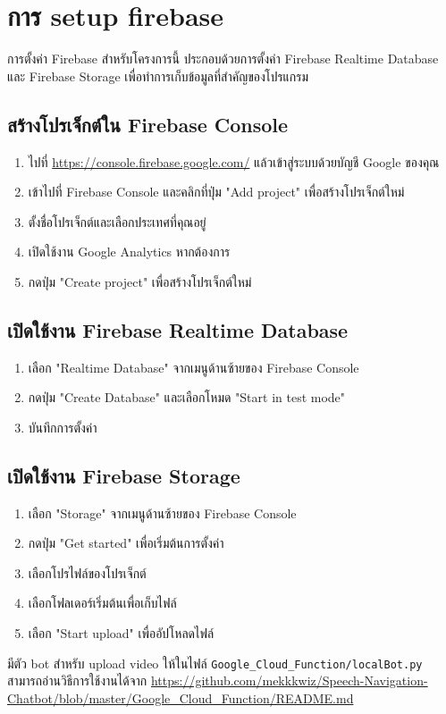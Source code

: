 
\chapter{การ setup firebase}

การตั้งค่า Firebase สำหรับโครงการนี้ ประกอบด้วยการตั้งค่า Firebase Realtime Database และ Firebase Storage
เพื่อทำการเก็บข้อมูลที่สำคัญของโปรแกรม

\section{สร้างโปรเจ็กต์ใน Firebase Console}
\begin{enumerate}
\item ไปที่ \url{https://console.firebase.google.com/} แล้วเข้าสู่ระบบด้วยบัญชี Google ของคุณ
\item เข้าไปที่ Firebase Console และคลิกที่ปุ่ม "Add project" เพื่อสร้างโปรเจ็กต์ใหม่
\item ตั้งชื่อโปรเจ็กต์และเลือกประเทศที่คุณอยู่
\item เปิดใช้งาน Google Analytics หากต้องการ
\item กดปุ่ม "Create project" เพื่อสร้างโปรเจ็กต์ใหม่
\end{enumerate}

\section{เปิดใช้งาน Firebase Realtime Database}
\begin{enumerate}
\item เลือก "Realtime Database" จากเมนูด้านซ้ายของ Firebase Console
\item กดปุ่ม "Create Database" และเลือกโหมด "Start in test mode"
\item บันทึกการตั้งค่า
\end{enumerate}

\section{เปิดใช้งาน Firebase Storage}
\begin{enumerate}
\item เลือก "Storage" จากเมนูด้านซ้ายของ Firebase Console
\item กดปุ่ม "Get started" เพื่อเริ่มต้นการตั้งค่า
\item เลือกโปรไฟล์ของโปรเจ็กต์
\item เลือกโฟลเดอร์เริ่มต้นเพื่อเก็บไฟล์
\item เลือก "Start upload" เพื่ออัปโหลดไฟล์
\end{enumerate}
มีตัว bot สำหรับ upload video ให้ในไฟล์ \verb+Google_Cloud_Function/localBot.py+ สามารถอ่านวิธีการใช้งานได้จาก
\url{https://github.com/mekkkwiz/Speech-Navigation-Chatbot/blob/master/Google_Cloud_Function/README.md}

